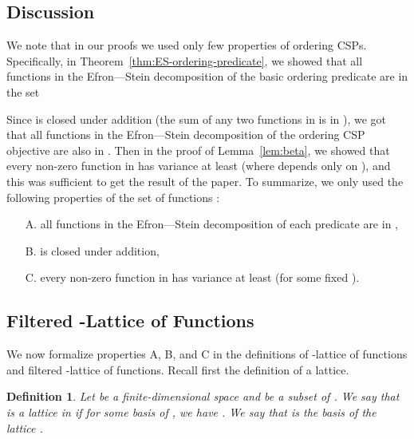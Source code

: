 \documentclass[11pt]{article}
\newtheorem{definition}[theorem]{Definition}
\begin{document}
\subsection{Discussion}
We note that in our proofs we used only few properties of ordering CSPs. Specifically, in Theorem~\ref{thm:ES-ordering-predicate}, we showed that
all functions in the Efron---Stein decomposition of the basic ordering predicate are in the set

Since  is closed under addition (the sum of any two functions in  is in ), we got that
all functions in the Efron---Stein decomposition of the ordering CSP objective  are also in .
Then in the proof of  Lemma~\ref{lem:beta}, we showed that every non-zero function in   has
variance at least  (where  depends only on ), and this was sufficient to get the result of the paper.
To summarize, we only used the following properties of the set of functions :
\begin{itemize}
\item[A.] all functions in the Efron---Stein decomposition of each predicate are in ,
\item[B.]  is closed under addition,
\item[C.] every non-zero function in  has variance at least  (for some fixed ).
\end{itemize}
\subsection{Filtered -Lattice of Functions}
We now formalize properties A, B, and C in the definitions of -lattice of functions and filtered -lattice of functions.
Recall first the definition of a lattice.
\begin{definition}
Let  be a finite-dimensional space and  be a subset of . We say that  is a lattice in  if
for some basis  of , we have .
We say that  is the basis of the lattice .
\end{definition}
\end{document}
